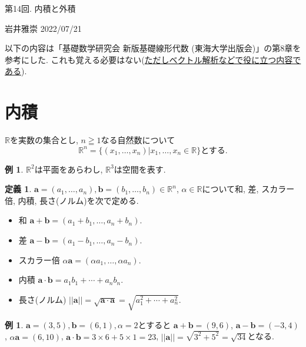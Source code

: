 \documentclass[dvipdfmx,a4paper,11pt]{article}
\newcommand{\R}{\mathbb{R}}
\theoremstyle{definition}
\newtheorem{dfn}[thm]{定義}
\newtheorem{exa}[thm]{例}
\begin{document}
\begin{center}
{\Large 第14回. 内積と外積} 
\end{center}

\begin{flushright}
 岩井雅崇 2022/07/21
\end{flushright}

以下の内容は「基礎数学研究会 新版基礎線形代数 (東海大学出版会)」の第8章を参考にした. 
これも覚える必要はない(\underline{ただしベクトル解析などで役に立つ内容である}).

\section{内積}

$\R$を実数の集合とし, $n \geqq1$なる自然数について
$$
\R^n  = \{ (x_1, \ldots, x_n) | x_1, \ldots, x_n \in \R\} \text{とする.}
$$
\begin{exa}
$\R^2$は平面をあらわし, $\R^3$は空間を表す.
\end{exa}

\begin{tcolorbox}[
    colback = white,
    colframe = green!35!black,
    fonttitle = \bfseries,
    breakable = true]
    \begin{dfn}
$\bm{a}=(a_1, \ldots, a_n), \bm{b}=(b_1, \ldots, b_n)\in \R^n$, $\alpha \in \R$について和, 差, スカラー倍, 内積, 長さ(ノルム)を次で定める.
\begin{itemize}
\item 和 $\bm{a} + \bm{b} = (a_1 + b_1, \ldots, a_n + b_n)$.
\item 差 $\bm{a} - \bm{b} = (a_1 - b_1, \ldots, a_n - b_n)$.
\item スカラー倍 $\alpha \bm{a} = (\alpha a_1, \ldots, \alpha a_n)$.
\item 内積 $\bm{a} \cdot\bm{b} = a_1 b_1 + \cdots + a_n b_n $.
\item 長さ(ノルム) $||\bm{a}||= \sqrt{\bm{a} \cdot\bm{a}} = \sqrt{a_{1}^{2}+ \cdots + a_{n}^{2}}$.
\end{itemize}
    \end{dfn}
 \end{tcolorbox}

\begin{exa}
$\bm{a}=(3,5), \bm{b} = (6,1), \alpha=2$とすると
$\bm{a} + \bm{b} =(9,6)$, $\bm{a} - \bm{b} =(-3,4)$, $\alpha \bm{a}= (6,10)$, 
$\bm{a} \cdot\bm{b} = 3 \times 6 + 5 \times 1 =23$, $||\bm{a}||=\sqrt{3^2 + 5^2}= \sqrt{34}$となる.
\end{exa}
\end{document}
